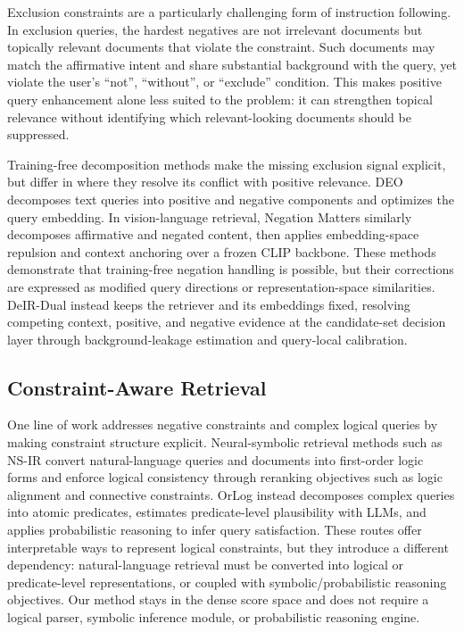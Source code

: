 \documentclass[letterpaper]{article}
\newcommand{\method}{DeIR-Dual}
\begin{document}
Exclusion constraints are a particularly challenging form of
instruction following.  In exclusion queries, the hardest negatives are
not irrelevant documents but topically relevant documents that violate
the constraint.  Such documents may match the affirmative intent and
share substantial background with the query, yet violate the user's
``not'', ``without'', or ``exclude'' condition.  This makes positive
query enhancement alone less suited to the problem: it can strengthen
topical relevance without identifying which relevant-looking documents
should be suppressed.

Training-free decomposition methods make the missing exclusion signal
explicit, but differ in where they resolve its conflict with positive
relevance.  DEO \cite{deo2026} decomposes text queries into positive and
negative components and optimizes the query embedding.  In
vision-language retrieval, Negation Matters \cite{pokhrel2026negation}
similarly decomposes affirmative and negated content, then applies
embedding-space repulsion and context anchoring over a frozen CLIP
backbone.  These methods demonstrate that training-free negation
handling is possible, but their corrections are expressed as modified
query directions or representation-space similarities.  \method{}
instead keeps the retriever and its embeddings fixed, resolving
competing context, positive, and negative evidence at the candidate-set
decision layer through background-leakage estimation and query-local
calibration.

\subsection{Constraint-Aware Retrieval}

One line of work addresses negative constraints and complex logical
queries by making constraint structure explicit.  Neural-symbolic
retrieval methods such as NS-IR \cite{xu2025logical} convert
natural-language queries and documents into first-order logic forms and
enforce logical consistency through reranking objectives such as logic
alignment and connective constraints.  OrLog \cite{hoveyda2026orlog}
instead decomposes complex queries into atomic predicates, estimates
predicate-level plausibility with LLMs, and applies probabilistic
reasoning to infer query satisfaction.  These routes offer
interpretable ways to represent logical constraints, but they introduce
a different dependency: natural-language retrieval must be converted
into logical or predicate-level representations, or coupled with
symbolic/probabilistic reasoning objectives.  Our method stays in the
dense score space and does not require a logical parser, symbolic
inference module, or probabilistic reasoning engine.
\end{document}

